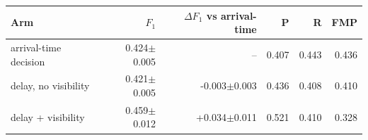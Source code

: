 \begin{tabular}{lrrrrr}
\toprule
Arm & $F_1$ & $\Delta F_1$ vs arrival-time & P & R & FMP \\
\midrule
arrival-time decision & 0.424$\pm$0.005 & -- & 0.407 & 0.443 & 0.436 \\
delay, no visibility & 0.421$\pm$0.005 & -0.003$\pm$0.003 & 0.436 & 0.408 & 0.410 \\
delay + visibility & 0.459$\pm$0.012 & +0.034$\pm$0.011 & 0.521 & 0.410 & 0.328 \\
\bottomrule
\end{tabular}